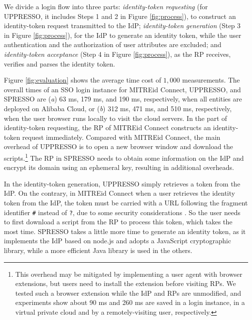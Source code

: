 We divide a login flow into three parts:
{\em identity-token requesting} (for UPPRESSO, it includes Steps 1 and 2 in Figure \ref{fig:process}),
  to construct an identity-token request transmitted to the IdP;
{\em identity-token generation} (Step 3 in Figure \ref{fig:process}),
    for the IdP to generate an identity token, while the user authentication and  the authorization of user attributes are excluded;
and {\em identity-token acceptance} (Step 4 in Figure \ref{fig:process}),
    as the RP receives, verifies and parses the identity token.


Figure \ref{fig:evaluation} shows
        the average time cost of $1,000$ measurements.
The overall times of an SSO login instance for MITREid Connect, UPPRESSO, and SPRESSO are
 (\emph{a}) 63 ms, 179 ms, and 190 ms, respectively, when all entities are deployed on Alibaba Cloud,
or
 (\emph{b})
312 ms, 471 ms, and 510 ms, respectively, when the user browser runs locally to visit the cloud servers.
%
In the part of identity-token requesting, %
the RP of MITREid Connect constructs an identity-token request immediately.
Compared with MITREid Connect, the main overhead of UPPRESSO is to open a new browser window and download the scripts.\footnote{This overhead may be mitigated %
    by implementing a user agent with browser extensions,
but users need to install the extension
    before visiting RPs.
We tested such a browser extension while the IdP and RPs are unmodified,
and experiments show about 90 ms and 260 ms are saved in a login instance,
    in a virtual private cloud and by a remotely-visiting user, respectively.}
The RP in SPRESSO needs  to obtain some information on the IdP  %
     and encrypt its domain using an ephemeral key, resulting in additional overheads.




In the identity-token generation,
UPPRESSO simply retrieves a token from the IdP.
On the contrary, in MITREid Connect when a user retrieves the identity token from the IdP,
 the token must be carried with a URL following the fragment identifier \verb+#+ instead of \verb+?+, due to some security considerations \cite{de2014oauth}.
So the user needs to first download a script from the RP to process this token, which takes the most time.
SPRESSO takes a little more time to generate an identity token,
    as it implements the IdP based on node.js and adopts a JavaScript cryptographic library,
 while a more efficient Java library is used in the others.

